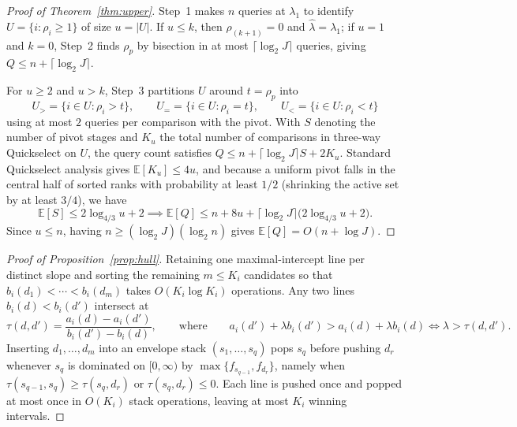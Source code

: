 \documentclass[a4paper,10pt]{article}
\theoremstyle{plain}
\theoremstyle{remark}
\begin{document}
\begin{proof}[Proof of Theorem~\ref{thm:upper}]
Step~1 makes $n$ queries at $\lambda_1$ to identify $U=\{i:\rho_i\ge 1\}$ of size $u=|U|$. If $u\le k$, then $\rho_{(k+1)}=0$ and $\widehat\lambda=\lambda_1$; if $u=1$ and $k=0$, Step~2 finds $\rho_p$ by bisection in at most $\lceil\log_2 J\rceil$ queries, giving $Q\le n+\lceil\log_2 J\rceil$.

For $u\ge 2$ and $u>k$, Step~3 partitions $U$ around $t=\rho_p$ into
\begin{equation}\label{eq:proof-thm34-part}
 U_{>}=\{i\in U:\rho_i>t\},\qquad
 U_{=}=\{i\in U:\rho_i=t\},\qquad
 U_{<}=\{i\in U:\rho_i<t\}
\end{equation}
using at most $2$ queries per comparison with the pivot. With $S$ denoting the number of pivot stages and $K_u$ the total number of comparisons in three-way Quickselect on $U$, the query count satisfies $Q \le n + \lceil\log_2 J\rceil S + 2K_u$. Standard Quickselect analysis \cite{knuth} gives $\mathbb E[K_u]\le 4u$, and because a uniform pivot falls in the central half of sorted ranks with probability at least $1/2$ (shrinking the active set by at least $3/4$), we have
\begin{equation}\label{eq:proof-thm34-stages}
 \mathbb E[S]\le 2\log_{4/3}u+2
 \implies
 \mathbb E[Q]\le n+8u+\lceil\log_2 J\rceil\bigl(2\log_{4/3}u+2\bigr).
\end{equation}
Since $u\le n$, having $n\ge(\log_2 J)(\log_2 n)$ gives $\mathbb E[Q]=O(n+\log J)$.
\end{proof}

\begin{proof}[Proof of Proposition~\ref{prop:hull}]
Retaining one maximal-intercept line per distinct slope and sorting the remaining $m\le K_i$ candidates so that $b_i(d_1)<\cdots<b_i(d_m)$ takes $O(K_i\log K_i)$ operations. Any two lines $b_i(d)<b_i(d')$ intersect at
\begin{equation}\label{eq:proof-prop41-tau}
 \tau(d,d')=\frac{a_i(d)-a_i(d')}{b_i(d')-b_i(d)},
 \qquad\text{where}\qquad
 a_i(d')+\lambda b_i(d') > a_i(d)+\lambda b_i(d)\iff \lambda>\tau(d,d').
\end{equation}
Inserting $d_1,\ldots,d_m$ into an envelope stack $(s_1,\ldots,s_q)$ pops $s_q$ before pushing $d_r$ whenever $s_q$ is dominated on $[0,\infty)$ by $\max\{f_{s_{q-1}},f_{d_r}\}$, namely when $\tau(s_{q-1},s_q)\ge\tau(s_q,d_r)$ or $\tau(s_q,d_r)\le 0$. Each line is pushed once and popped at most once in $O(K_i)$ stack operations, leaving at most $K_i$ winning intervals.
\end{proof}
\end{document}

